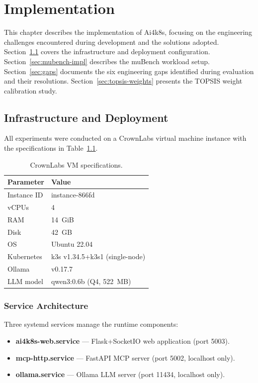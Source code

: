 \chapter{Implementation}
\label{ch:implementation}

This chapter describes the implementation of Ai4k8s, focusing on the engineering
challenges encountered during development and the solutions adopted. Section~\ref{sec:infra}
covers the infrastructure and deployment configuration. Section~\ref{sec:mubench-impl}
describes the muBench workload setup. Section~\ref{sec:gaps} documents the six
engineering gaps identified during evaluation and their resolutions.
Section~\ref{sec:topsis-weights} presents the TOPSIS weight calibration study.

\section{Infrastructure and Deployment}
\label{sec:infra}

All experiments were conducted on a CrownLabs virtual machine instance with the
specifications in Table~\ref{tab:vm-spec}.

\begin{table}[h]
  \centering
  \caption{CrownLabs VM specifications.}
  \label{tab:vm-spec}
  \begin{tabular}{ll}
    \toprule
    Parameter & Value \\
    \midrule
    Instance ID    & instance-866fd \\
    vCPUs          & 4 \\
    RAM            & 14~GiB \\
    Disk           & 42~GB \\
    OS             & Ubuntu 22.04 \\
    Kubernetes     & k3s v1.34.5+k3s1 (single-node) \\
    Ollama         & v0.17.7 \\
    LLM model      & qwen3:0.6b (Q4, 522~MB) \\
    \bottomrule
  \end{tabular}
\end{table}

\subsection{Service Architecture}
Three systemd services manage the runtime components:
\begin{itemize}
  \item \textbf{ai4k8s-web.service} — Flask+SocketIO web application (port 5003).
  \item \textbf{mcp-http.service} — FastAPI MCP server (port 5002, localhost only).
  \item \textbf{ollama.service} — Ollama LLM server (port 11434, localhost only).
\end{itemize}

